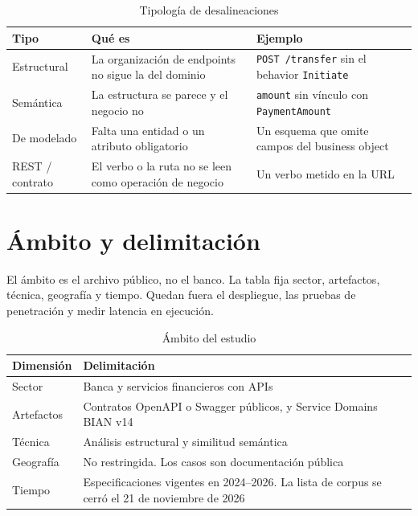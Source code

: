 \begin{table}[H]
  \centering
  \caption{Tipología de desalineaciones}
  \label{tab:tipologias}
  \small
  \begin{tabular}{@{}p{}p{}p{}@{}}
    \toprule
    Tipo & Qué es & Ejemplo \\
    \midrule
    Estructural & La organización de endpoints no sigue la del dominio & \texttt{POST /transfer} sin el behavior \texttt{Initiate} \\
    Semántica & La estructura se parece y el negocio no & \texttt{amount} sin vínculo con \texttt{PaymentAmount} \\
    De modelado & Falta una entidad o un atributo obligatorio & Un esquema que omite campos del business object \\
    REST / contrato & El verbo o la ruta no se leen como operación de negocio & Un verbo metido en la URL \\
    \bottomrule
  \end{tabular}
\end{table}

\section{Ámbito y delimitación}

El ámbito es el archivo público, no el banco. La tabla fija sector, artefactos, técnica, geografía y tiempo. Quedan fuera el despliegue, las pruebas de penetración y medir latencia en ejecución.

\begin{table}[H]
  \centering
  \caption{Ámbito del estudio}
  \label{tab:ambito}
  \begin{tabular}{@{}p{}p{}@{}}
    \toprule
    Dimensión & Delimitación \\
    \midrule
    Sector & Banca y servicios financieros con APIs \\
    Artefactos & Contratos OpenAPI o Swagger públicos, y Service Domains BIAN v14 \\
    Técnica & Análisis estructural y similitud semántica \\
    Geografía & No restringida. Los casos son documentación pública \\
    Tiempo & Especificaciones vigentes en 2024--2026. La lista de corpus se cerró el 21 de noviembre de 2026 \\
    \bottomrule
  \end{tabular}
\end{table}

